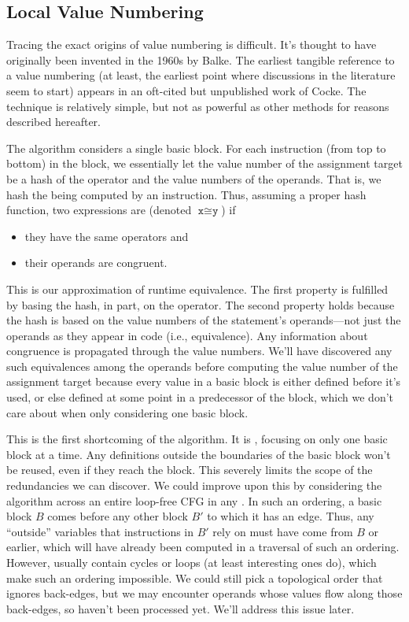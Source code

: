 \subsection{Local Value Numbering}\label{sec:vn:local}

Tracing the exact origins of value numbering is difficult.  It's thought to
have originally been invented in the 1960s by Balke.  The
earliest tangible reference to a value numbering (at least, the earliest point
where discussions in the literature seem to start) appears in an oft-cited but
unpublished work of Cocke.  The technique is relatively simple,
but not as powerful as other methods for reasons described hereafter.

The algorithm considers a single basic block.  For each instruction (from top
to bottom) in the block, we essentially let the value number of the assignment
target be a hash of the operator and the value numbers of the operands.  That
is, we hash the  being computed by an instruction.  Thus,
assuming a proper hash function, two expressions are  (denoted
$\texttt{x} \cong \texttt{y}$) if
%
\begin{itemize}
%
  \item they have the same operators and
%
  \item their operands are congruent.
%
\end{itemize}
%
\noindent This is our approximation of runtime equivalence.  The first property
is fulfilled by basing the hash, in part, on the operator.  The second property
holds because the hash is based on the value numbers of the statement's
operands---not just the operands as they appear in code (i.e., 
equivalence).  Any information about congruence is propagated through the value
numbers.  We'll have discovered any such equivalences among the operands before
computing the value number of the assignment target because every value in a
basic block is either defined before it's used, or else defined at some point
in a predecessor of the block, which we don't care about when only considering
one basic block.

This is the first shortcoming of the algorithm.  It is , focusing
on only one basic block at a time.  Any definitions outside the boundaries of
the basic block won't be reused, even if they reach the block.  This severely
limits the scope of the redundancies we can discover.  We could improve upon
this by considering the algorithm across an entire loop-free \gls{CFG} in any
.  In such an ordering, a basic block $B$ comes before
any other block $B'$ to which it has an edge.  Thus, any ``outside'' variables
that instructions in $B'$ rely on must have come from $B$ or earlier, which
will have already been computed in a traversal of such an ordering.  However,
 usually contain cycles or loops (at least interesting ones do),
which make such an ordering impossible.  We could still pick a topological
order that ignores back-edges, but we may encounter operands whose values flow
along those back-edges, so haven't been processed yet.  We'll address this
issue later.

